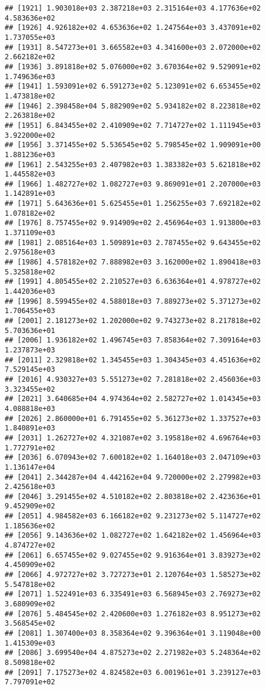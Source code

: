 \documentclass[]{article}
\begin{document}
\begin{verbatim}
## [1921] 1.903018e+03 2.387218e+03 2.315164e+03 4.177636e+02 4.583636e+02
## [1926] 4.926182e+02 4.653636e+02 1.247564e+03 3.437091e+02 1.737055e+03
## [1931] 8.547273e+01 3.665582e+03 4.341600e+03 2.072000e+02 2.662182e+02
## [1936] 3.891818e+02 5.076000e+02 3.670364e+02 9.529091e+02 1.749636e+03
## [1941] 1.593091e+02 6.591273e+02 5.123091e+02 6.653455e+02 1.473818e+02
## [1946] 2.398458e+04 5.882909e+02 5.934182e+02 8.223818e+02 2.263818e+02
## [1951] 6.843455e+02 2.410909e+02 7.714727e+02 1.111945e+03 3.922000e+02
## [1956] 3.371455e+02 5.536545e+02 5.798545e+02 1.909091e+00 1.881236e+03
## [1961] 2.543255e+03 2.407982e+03 1.383382e+03 5.621818e+02 1.445582e+03
## [1966] 1.482727e+02 1.082727e+03 9.869091e+01 2.207000e+03 1.142891e+03
## [1971] 5.643636e+01 5.625455e+01 1.256255e+03 7.692182e+02 1.078182e+02
## [1976] 8.757455e+02 9.914909e+02 2.456964e+03 1.913800e+03 1.371109e+03
## [1981] 2.085164e+03 1.509891e+03 2.787455e+02 9.643455e+02 2.975618e+03
## [1986] 4.578182e+02 7.888982e+03 3.162000e+02 1.890418e+03 5.325818e+02
## [1991] 4.805455e+02 2.210527e+03 6.636364e+01 4.978727e+02 1.442036e+03
## [1996] 8.599455e+02 4.588018e+03 7.889273e+02 5.371273e+02 1.706455e+03
## [2001] 2.181273e+02 1.202000e+02 9.743273e+02 8.217818e+02 5.703636e+01
## [2006] 1.936182e+02 1.496745e+03 7.858364e+02 7.309164e+03 1.237873e+03
## [2011] 2.329818e+02 1.345455e+03 1.304345e+03 4.451636e+02 7.529145e+03
## [2016] 4.930327e+03 5.551273e+02 7.281818e+02 2.456036e+03 3.323455e+02
## [2021] 3.640685e+04 4.974364e+02 2.582727e+02 1.014345e+03 4.088818e+03
## [2026] 2.860000e+01 6.791455e+02 5.361273e+02 1.337527e+03 1.840891e+03
## [2031] 1.262727e+02 4.321087e+02 3.195818e+02 4.696764e+03 1.772791e+02
## [2036] 6.070943e+02 7.600182e+02 1.164018e+03 2.047109e+03 1.136147e+04
## [2041] 2.344287e+04 4.442162e+04 9.720000e+02 2.279982e+03 2.425618e+03
## [2046] 3.291455e+02 4.510182e+02 2.803818e+02 2.423636e+01 9.452909e+02
## [2051] 4.984582e+03 6.166182e+02 9.231273e+02 5.114727e+02 1.185636e+02
## [2056] 9.143636e+02 1.082727e+02 1.642182e+02 1.456964e+03 4.874727e+02
## [2061] 6.657455e+02 9.027455e+02 9.916364e+01 3.839273e+02 4.450909e+02
## [2066] 4.972727e+02 3.727273e+01 2.120764e+03 1.585273e+02 5.547818e+02
## [2071] 1.522491e+03 6.335491e+03 6.568945e+03 2.769273e+02 3.680909e+02
## [2076] 5.484545e+02 2.420600e+03 1.276182e+03 8.951273e+02 3.568545e+02
## [2081] 1.307400e+03 8.358364e+02 9.396364e+01 3.119048e+00 1.415309e+03
## [2086] 3.699540e+04 4.875273e+02 2.271982e+03 5.248364e+02 8.509818e+02
## [2091] 7.175273e+02 4.824582e+03 6.001961e+01 3.239127e+03 7.797091e+02

\end{verbatim}
\end{document}
